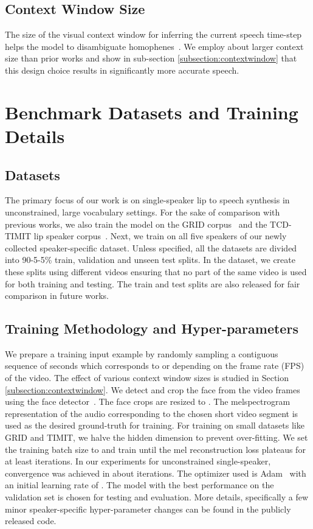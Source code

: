 \documentclass[10pt,twocolumn,letterpaper]{article}
\begin{document}
\subsection{Context Window Size}
The size of the visual context window for inferring the current speech time-step helps the model to disambiguate homophenes~\cite{ephrat2017vid2speech}. We employ about  larger context size than prior works and show in sub-section \ref{subsection:contextwindow} that this design choice results in significantly more accurate speech.



\section{Benchmark Datasets and Training Details}
\label{section:training_details}
\subsection{Datasets}
The primary focus of our work is on single-speaker lip to speech synthesis in unconstrained, large vocabulary settings. For the sake of comparison with previous works, we also train the \modelname model on the GRID corpus~\cite{cooke2006audio} and the TCD-TIMIT lip speaker corpus~\cite{harte2015tcd}. Next, we train on all five speakers of our newly collected speaker-specific \modelname dataset. Unless specified, all the datasets are divided into 90-5-5\% train, validation and unseen test splits. In the \modelname dataset, we create these splits using different videos ensuring that no part of the same video is used for both training and testing. The train and test splits are also released for fair comparison in future works.

\subsection{Training Methodology and Hyper-parameters}
\label{subsection:hparams}
We prepare a training input example by randomly sampling a contiguous sequence of  seconds which corresponds to  or  depending on the frame rate (FPS) of the video. The effect of various context window sizes is studied in Section \ref{subsection:contextwindow}. We detect and crop the face from the video frames using the  face detector~\cite{zhang2017s3fd}. The face crops are resized to . The melspectrogram representation of the audio corresponding to the chosen short video segment is used as the desired ground-truth for training. For training on small datasets like GRID and TIMIT, we halve the hidden dimension to prevent over-fitting. We set the training batch size to  and train until the mel reconstruction loss plateaus for at least  iterations. In our experiments for unconstrained single-speaker, convergence was achieved in about  iterations. The optimizer used is Adam~\cite{kingma2014adam} with an initial learning rate of . The model with the best performance on the validation set is chosen for testing and evaluation. More details, specifically a few minor speaker-specific hyper-parameter changes can be found in the publicly released code\footnotemark[2].
\end{document}
